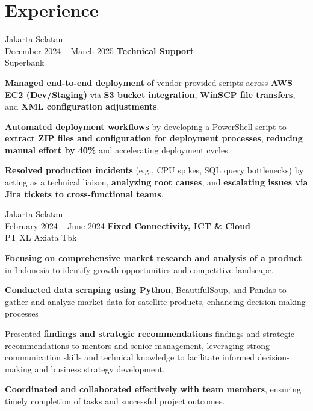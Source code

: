 \documentclass[../main.tex]{subfiles}
\begin{document}
\section{Experience}

\begin{twocolentry}{
		Jakarta Selatan \\
		December 2024 – March 2025}
	\textbf{Technical Support}\\
	Superbank
\end{twocolentry}

\vspace{0.10 cm}
\begin{onecolentry}
	\begin{highlights}
		\item \textbf{Managed end-to-end deployment} of vendor-provided scripts across \textbf{AWS EC2 (Dev/Staging)} via \textbf{S3 bucket integration}, \textbf{WinSCP file transfers}, and \textbf{XML configuration adjustments}.
		\item \textbf{Automated deployment workflows} by developing a PowerShell script to \textbf{extract ZIP files and configuration for deployment processes}, \textbf{reducing manual effort by 40\%} and accelerating deployment cycles.
		\item \textbf{Resolved production incidents} (e.g., CPU spikes, SQL query bottlenecks) by acting as a technical liaison, \textbf{analyzing root causes}, and \textbf{escalating issues via Jira tickets to cross-functional teams}.
	\end{highlights}
\end{onecolentry}

\vspace{0.20 cm}

\begin{twocolentry}{
		Jakarta Selatan \\
		February 2024 – June 2024}
	\textbf{Fixed Connectivity, ICT \& Cloud}\\
	PT XL Axiata Tbk
\end{twocolentry}

\vspace{0.10 cm}
\begin{onecolentry}
	\begin{highlights}
		\item \textbf{Focusing on comprehensive market research and analysis of a product} in Indonesia to identify growth opportunities and competitive landscape.
		\item \textbf{Conducted data scraping using Python}, BeautifulSoup, and Pandas to gather and analyze market data for satellite products, enhancing decision-making processes
		\item Presented \textbf{findings and strategic recommendations} findings and strategic recommendations to mentors and senior management, leveraging strong communication skills and technical knowledge to facilitate informed decision-making and business strategy development.
		\item \textbf{Coordinated and collaborated effectively with team members}, ensuring timely completion of tasks and successful project outcomes.
	\end{highlights}
\end{onecolentry}
\end{document}
